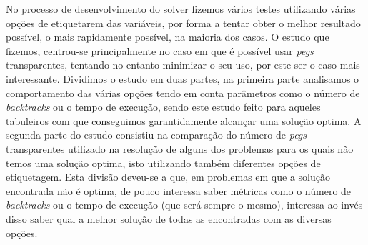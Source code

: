 \documentclass{llncs}
\begin{document}
No processo de desenvolvimento do solver fizemos v\'{a}rios testes utilizando v\'{a}rias op\c{c}\~{o}es de etiquetarem das vari\'{a}veis, por forma a tentar obter o melhor resultado poss\'{i}vel, o mais rapidamente poss\'{i}vel, na maioria dos casos.
O estudo que fizemos, centrou-se principalmente no caso em que \'{e} poss\'{i}vel usar \emph{pegs} transparentes, tentando no entanto minimizar o seu uso, por este ser o caso mais interessante.
Dividimos o estudo em duas partes, na primeira parte analisamos o comportamento das v\'{a}rias op\c{c}\~{o}es tendo em conta parâmetros como o n\'{u}mero de \emph{backtracks} ou o tempo de execu\c{c}\~{a}o, sendo este estudo feito para aqueles tabuleiros com que conseguimos garantidamente alcan\c{c}ar uma solu\c{c}\~{a}o optima.
A segunda parte do estudo consistiu na compara\c{c}\~{a}o do n\'{u}mero de \emph{pegs} transparentes utilizado na resolu\c{c}\~{a}o de alguns dos problemas para os quais n\~{a}o temos uma solu\c{c}\~{a}o optima, isto utilizando tamb\'{e}m diferentes op\c{c}\~{o}es de etiquetagem.
Esta divis\~{a}o deveu-se a que, em problemas em que a solu\c{c}\~{a}o encontrada n\~{a}o \'{e} optima, de pouco interessa saber m\'{e}tricas como o n\'{u}mero de \emph{backtracks} ou o tempo de execu\c{c}\~{a}o (que ser\'{a} sempre o mesmo), interessa ao inv\'{e}s disso saber qual a melhor solu\c{c}\~{a}o de todas as encontradas com as diversas op\c{c}\~{o}es.
\end{document}
